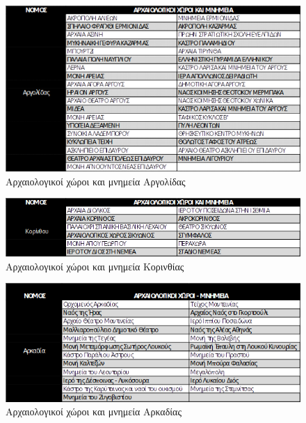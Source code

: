 \documentclass[12pt]{article}
\begin{document}
	\begin{figure} [H]
		\begin{center}
			\includegraphics [scale = 1] {argolida3.png}
			\caption{Αρχαιολογικοί χώροι και μνημεία Αργολίδας}
		\end{center}
	\end{figure}
	
	\begin{figure} [H]
		\begin{center}
			\includegraphics [scale = 0.92] {korinthia3.png}
			\caption{Αρχαιολογικοί χώροι και μνημεία Κορινθίας}
		\end{center}
	\end{figure}

	\begin{figure} [H]
		\begin{center}
			\includegraphics [scale = 0.95] {arkadia3.png}
			\caption{Αρχαιολογικοί χώροι και μνημεία Αρκαδίας}
		\end{center}
	\end{figure}
\end{document}
